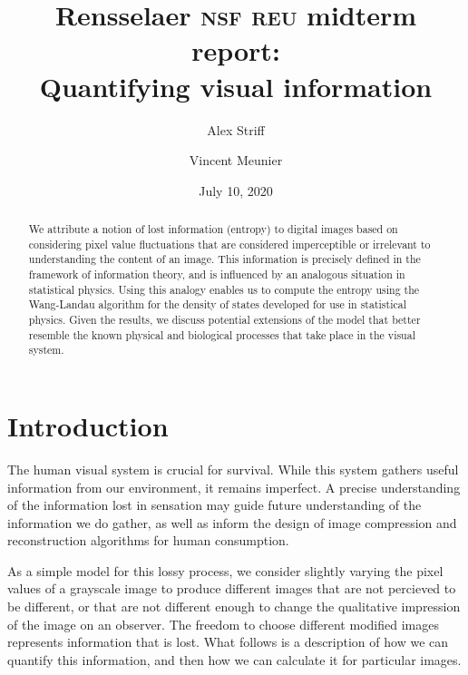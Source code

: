 \documentclass[aps,reprint]{revtex4-2}
\theoremstyle{plain}
\theoremstyle{definition}
\begin{document}
\title{Rensselaer \textsc{nsf} \textsc{reu} midterm report:\\
Quantifying visual information}
\author{Alex Striff}
\author{Vincent Meunier}
\date{July 10, 2020}
\begin{abstract}
  We attribute a notion of lost information (entropy) to digital images based on
  considering pixel value fluctuations that are considered imperceptible or
  irrelevant to understanding the content of an image. This information is
  precisely defined in the framework of information theory, and is influenced by
  an analogous situation in statistical physics. Using this analogy enables us
  to compute the entropy using the Wang-Landau algorithm for the density of
  states developed for use in statistical physics. Given the results, we discuss
  potential extensions of the model that better resemble the known physical and
  biological processes that take place in the visual system.
\end{abstract}
\maketitle

\section{Introduction}

The human visual system is crucial for survival. While this system gathers
useful information from our environment, it remains imperfect. A precise
understanding of the information lost in sensation may guide future
understanding of the information we do gather, as well as inform the design of
image compression and reconstruction algorithms for human consumption.

As a simple model for this lossy process, we consider slightly varying the pixel
values of a grayscale image to produce different images that are not percieved
to be different, or that are not different enough to change the qualitative
impression of the image on an observer. The freedom to choose different modified
images represents information that is lost. What follows is a description of how
we can quantify this information, and then how we can calculate it for
particular images.
\end{document}
